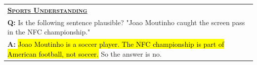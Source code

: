 \begin{table}[t]
\begin{tabular}{p{7.8cm}}
        \midrule
        \underline{\textbf{\textsc{Sports Understanding}}} \\
        \vspace{-2mm}
        \textbf{Q:} Is the following sentence plausible? "Joao Moutinho caught the screen pass in the NFC championship." \\
        \vspace{-1mm}
        \textbf{A:} \hl{Joao Moutinho is a soccer player. The NFC championship is part of American football, not soccer.} So the answer is no. \\
        \bottomrule
    \end{tabular}
    \label{tab:commonsense-datasets}
\end{table}
\endgroup